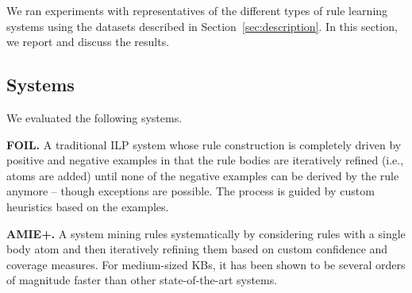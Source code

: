 We ran experiments with representatives of the different types of rule learning systems using the datasets described in Section~\ref{sec:description}. In this section, we report and discuss the results.

\subsection{Systems}
We evaluated the following systems.

\textbf{FOIL.} \cite{Quinlan-ML90:foil}
A traditional ILP system whose rule construction is completely driven by positive and negative examples in that the rule bodies are iteratively refined (i.e., atoms are added) until none of the negative examples can be derived by the rule anymore -- though exceptions are possible. The process is guided by custom heuristics based on the examples.

\textbf{AMIE+.} \cite{Galarraga+-VLDBJ15:amiep} A system mining rules systematically by considering rules with a single body atom and then iteratively refining them %
based on custom confidence and coverage measures.
For medium-sized KBs, it has been shown to be several orders of magnitude faster than other state-of-the-art systems. 


